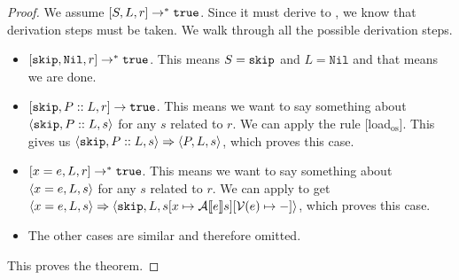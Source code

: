 \begin{proof}
We assume $[ S, L, r ] \to ^* \texttt{true}$. Since it must derive to \tr, we know that derivation steps must be taken. We walk through all the possible derivation steps. 
\begin{itemize}[noitemsep]
    \item $[ \texttt{skip}, \texttt{Nil}, r ] \to ^* \texttt{true}$. This means $S = \texttt{skip}$ and $L = \texttt{Nil}$ and that means we are done.
    \item $[ \texttt{skip}, P::L,  r ] \to \texttt{true}$. This means we want to say something about $\langle \texttt{skip}, P::L, s \rangle$ for any $s$ related to $r$. We can apply the rule [load$_{\textrm{os}}$]. This gives us $\langle \texttt{skip}, P::L, s \rangle \Rightarrow \langle P, L, s \rangle$, which proves this case. 
    \item $[ x=e, L, r ] \to ^{*} \texttt{true}$. This means we want to say something about $\langle x=e, L, s \rangle$ for any $s$ related to $r$. We can apply \asssos to get $\langle x=e, L, s \rangle \Rightarrow \langle \texttt{skip}, L, s[x \mapsto \mathcal{A} \llbracket e \rrbracket s][\mathcal{V}(e)\mapsto-] \rangle$, which proves this case. 
     \item The other cases are similar and therefore omitted. 
\end{itemize}
This proves the theorem.
\end{proof}

 



